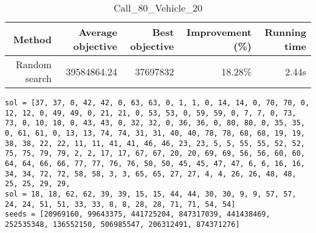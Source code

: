 \begin{table}[ht]
\centering
\caption{Call\_80\_Vehicle\_20}
\label{tab:call80vehicle20}
\begin{tabular}{|r|r|r|r|r|}
Method & Average objective & Best objective & Improvement (\%) & Running time \\
\hline
Random search & 39584864.24 & 37697832 & 18.28\% & 2.44s\\
\end{tabular}
\end{table}
\begin{lstlisting}[label={lst:call80vehicle20},caption=Optimal solution call\_80\_vehicle\_20]
sol = [37, 37, 0, 42, 42, 0, 63, 63, 0, 1, 1, 0, 14, 14, 0, 70, 70, 0, 12, 12, 0, 49, 49, 0, 21, 21, 0, 53, 53, 0, 59, 59, 0, 7, 7, 0, 73, 73, 0, 10, 10, 0, 43, 43, 0, 32, 32, 0, 36, 36, 0, 80, 80, 0, 35, 35, 0, 61, 61, 0, 13, 13, 74, 74, 31, 31, 40, 40, 78, 78, 68, 68, 19, 19, 38, 38, 22, 22, 11, 11, 41, 41, 46, 46, 23, 23, 5, 5, 55, 55, 52, 52, 75, 75, 79, 79, 2, 2, 17, 17, 67, 67, 20, 20, 69, 69, 56, 56, 60, 60, 64, 64, 66, 66, 77, 77, 76, 76, 50, 50, 45, 45, 47, 47, 6, 6, 16, 16, 34, 34, 72, 72, 58, 58, 3, 3, 65, 65, 27, 27, 4, 4, 26, 26, 48, 48, 25, 25, 29, 29,
sol = 18, 18, 62, 62, 39, 39, 15, 15, 44, 44, 30, 30, 9, 9, 57, 57, 24, 24, 51, 51, 33, 33, 8, 8, 28, 28, 71, 71, 54, 54]
seeds = [20969160, 99643375, 441725204, 847317039, 441438469, 252535348, 136552150, 506985547, 206312491, 874371276]
\end{lstlisting}
\clearpage


